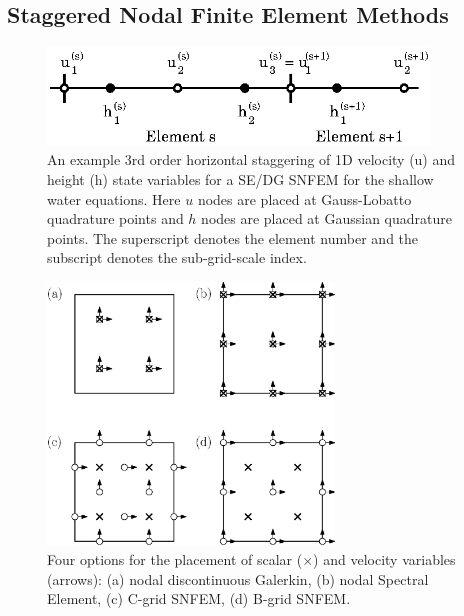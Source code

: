 \documentclass[11pt]{article}
\begin{document}
\subsection{Staggered Nodal Finite Element Methods} \label{sec:SNFEM}

\begin{figure}
\begin{center}
\includegraphics[width=4in]{SEStaggered}
\end{center}
\caption{An example 3rd order horizontal staggering of 1D velocity (u) and height (h) state variables for a SE/DG SNFEM for the shallow water equations.  Here $u$ nodes are placed at Gauss-Lobatto quadrature points and $h$ nodes are placed at Gaussian quadrature points.  The superscript denotes the element number and the subscript denotes the sub-grid-scale index.} \label{fig:SEStaggered}
\end{figure}

\begin{figure}
\begin{center}
\includegraphics[width=3in]{NodalArrangement}
\end{center}
\caption{Four options for the placement of scalar ($\times$) and velocity variables (arrows): (a) nodal discontinuous Galerkin, (b) nodal Spectral Element, (c) C-grid SNFEM, (d) B-grid SNFEM.} \label{fig:NodalArrangement}
\end{figure}
\end{document}
